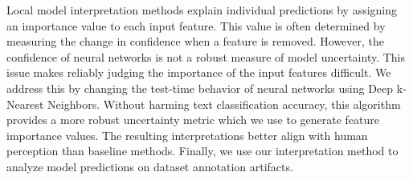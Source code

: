 Local model interpretation methods explain individual predictions by assigning an importance value to each input feature. This value is often determined by measuring the change in confidence when a feature is removed. However, the confidence of neural networks is not a robust measure of model uncertainty. This issue makes reliably judging the importance of the input features difficult. We address this by changing the test-time behavior of neural networks using Deep k-Nearest Neighbors. Without harming text classification accuracy, this algorithm provides a more robust uncertainty metric which we use to generate feature importance values. The resulting interpretations better align with human perception than baseline methods. Finally, we use our interpretation method to analyze model predictions on dataset annotation artifacts.
